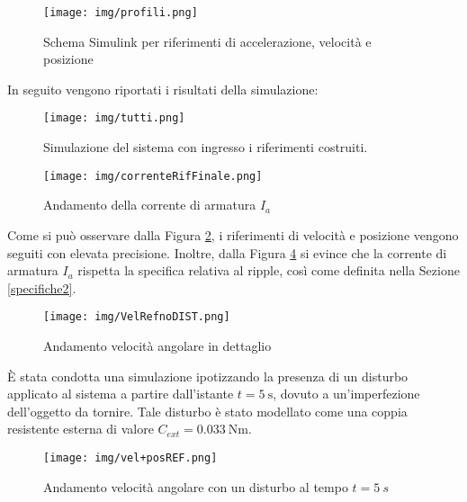 \documentclass{article}
\begin{document}
\begin{figure}[h!]
\centering
\texttt{[image: img/profili.png]}
\caption{Schema  Simulink per riferimenti di accelerazione, velocità e posizione}
\label{fig:rif}
\end{figure}
\newpage
In seguito vengono riportati i risultati della simulazione:

\begin{figure}[h!]
\centering
\texttt{[image: img/tutti.png]}
\caption{Simulazione del sistema con ingresso i riferimenti costruiti.}
\label{fig:5}
\end{figure}

\begin{figure}[h!]
\centering
\texttt{[image: img/correnteRifFinale.png]}
\caption{Andamento della corrente di armatura $I_a$}
\label{fig:6}
\end{figure}
\newpage
Come si può osservare dalla Figura \ref{fig:5}, i riferimenti di velocità e posizione vengono seguiti con elevata precisione. Inoltre, dalla Figura \ref{fig:6} si evince che la corrente di armatura $I_a$ rispetta la specifica relativa al ripple, così come definita nella Sezione \ref{specifiche2}.

\begin{figure}[h!]
\centering
\texttt{[image: img/VelRefnoDIST.png]}
\caption{Andamento velocità angolare in dettaglio}
\label{fig:6}
\end{figure}
È stata condotta una simulazione ipotizzando la presenza di un disturbo applicato al sistema a partire dall’istante $t = 5~\text{s}$, dovuto a un’imperfezione dell’oggetto da tornire. Tale disturbo è stato modellato come una coppia resistente esterna di valore $C_{ext} = 0.033~\text{Nm}$.

\begin{figure}[h!]
\centering
\texttt{[image: img/vel+posREF.png]}
\caption{Andamento velocità angolare con un disturbo al tempo $t=5~s$}
\label{fig:9}
\end{figure}
\end{document}

